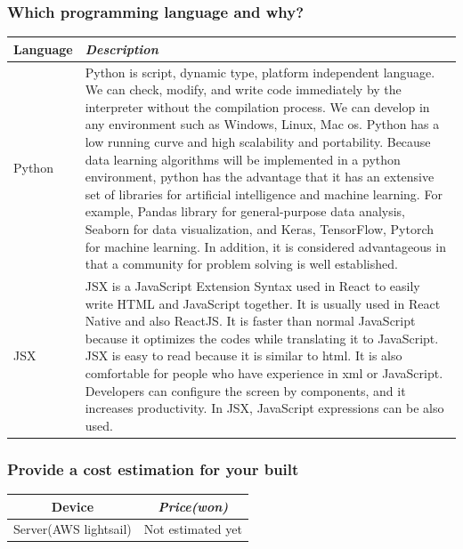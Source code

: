 \documentclass[conference]{IEEEtran}
\begin{document}
\subsubsection{Which programming language and why?}
\begin{table}[b!]
\begin{center}
\begin{tabular}{|p{}|p{}|}
\cline{1-2}
\textbf{Language} & \textbf{\textit{Description}} \\
\hline
Python&Python is script, dynamic type, platform independent language. 
We can check, modify, and write code immediately by the interpreter without the compilation process.
We can develop in any environment such as Windows, Linux, Mac os. 
Python has a low running curve and high scalability and portability. 
Because data learning algorithms will be implemented in a python environment, python has the advantage that it has an extensive set of libraries for artificial intelligence and machine learning. For example, Pandas library for general-purpose data analysis, Seaborn  for data visualization, and Keras, TensorFlow, Pytorch for machine learning. In addition, it is considered advantageous in that a community for problem solving is well established.\\
\hline
JSX&JSX is a JavaScript Extension Syntax used in React to easily write HTML and JavaScript together. It is usually used in React Native and also ReactJS. It is faster than normal JavaScript because it optimizes the codes while translating it to JavaScript. JSX is easy to read because it is similar to html. It is also comfortable for people who have experience in xml or JavaScript. Developers can configure the screen by components, and it increases productivity. In JSX, JavaScript expressions can be also used. \\
\hline
\end{tabular}
\label{tab1}
\end{center}
\end{table}


\subsubsection{Provide a cost estimation for your built}\;

\begin{table}[h!]
\begin{center}
\begin{tabular}{|c|c|}
\cline{1-2}
\textbf{Device} & \textbf{\textit{Price(won)}} \\
\hline
Server(AWS lightsail)& Not estimated yet\\ 
\hline
\end{tabular}
\label{tab1}
\end{center}
\end{table}
\end{document}
